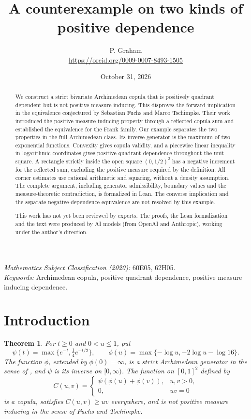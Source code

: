\documentclass[11pt]{article}
\title{A counterexample on two kinds of positive dependence}
\author{P. Graham\\ \small\url{https://orcid.org/0009-0007-8493-1505}}
\date{October 31, 2026}
\newtheorem{theorem}{Theorem}
\begin{document}
\maketitle
\begin{abstract}
We construct a strict bivariate Archimedean copula that is positively
quadrant dependent but is not positive measure inducing. This disproves
the forward implication in the equivalence conjectured by Sebastian
Fuchs and Marco Tschimpke. Their work introduced the positive measure
inducing property through a reflected copula sum and established the
equivalence for the Frank family. Our example separates the two
properties in the full Archimedean class. Its inverse generator is the
maximum of two exponential functions. Convexity gives copula validity,
and a piecewise linear inequality in logarithmic coordinates gives
positive quadrant dependence throughout the unit square. A rectangle
strictly inside the open square $(0,1/2)^2$ has a negative increment for the
reflected sum, excluding the positive measure required by the definition.
All corner estimates use rational arithmetic and squaring, without a
density assumption. The complete argument, including generator
admissibility, boundary values and the measure-theoretic contradiction,
is formalized in Lean. The converse implication and the separate
negative-dependence equivalence are not resolved by this example.

This work has not yet been reviewed by experts.
The proofs, the Lean formalization and the text were produced by AI models
(from OpenAI and Anthropic), working under the author's direction.
\end{abstract}
\medskip
\noindent\textit{Mathematics Subject Classification (2020):} 60E05, 62H05.\\
\textit{Keywords:} Archimedean copula, positive quadrant dependence,
positive measure inducing dependence.

\section{Introduction}
\begin{theorem}\label{thm:main}
For $t\geq0$ and $0<u\leq1$, put
\[
 \psi(t)=\max\{e^{-t},\tfrac14 e^{-t/2}\},\qquad
 \phi(u)=\max\{-\log u,-2\log u-\log16\}.
\]
The function $\phi$, extended by $\phi(0)=\infty$, is a strict Archimedean
generator in the sense of \cite{ft}, and $\psi$ is its inverse on
$[0,\infty)$. The function on $[0,1]^2$ defined by
\[
 C(u,v)=
 \begin{cases}\psi(\phi(u)+\phi(v)),&u,v>0,\\0,&uv=0\end{cases}
\]
is a copula, satisfies $C(u,v)\geq uv$ everywhere, and is not positive
measure inducing in the sense of Fuchs and Tschimpke.
\end{theorem}
\end{document}
